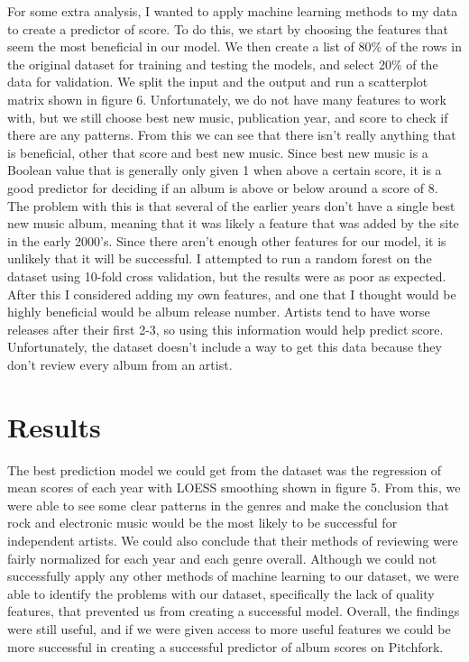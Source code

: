 \documentclass{article}
\begin{document}
For some extra analysis, I wanted to apply machine learning methods to
my data to create a predictor of score. To do this, we start by choosing
the features that seem the most beneficial in our model. We then create
a list of 80\% of the rows in the original dataset for training and
testing the models, and select 20\% of the data for validation. We split
the input and the output and run a scatterplot matrix shown in figure 6.
Unfortunately, we do not have many features to work with, but we still
choose best new music, publication year, and score to check if there are
any patterns. From this we can see that there isn't really anything that
is beneficial, other that score and best new music. Since best new music
is a Boolean value that is generally only given 1 when above a certain
score, it is a good predictor for deciding if an album is above or below
around a score of 8. The problem with this is that several of the
earlier years don't have a single best new music album, meaning that it
was likely a feature that was added by the site in the early 2000's.
Since there aren't enough other features for our model, it is unlikely
that it will be successful. I attempted to run a random forest on the
dataset using 10-fold cross validation, but the results were as poor as
expected. After this I considered adding my own features, and one that I
thought would be highly beneficial would be album release number.
Artists tend to have worse releases after their first 2-3, so using this
information would help predict score. Unfortunately, the dataset doesn't
include a way to get this data because they don't review every album
from an artist.

\section{Results}\label{results}

The best prediction model we could get from the dataset was the
regression of mean scores of each year with LOESS smoothing shown in
figure 5. From this, we were able to see some clear patterns in the
genres and make the conclusion that rock and electronic music would be
the most likely to be successful for independent artists. We could also
conclude that their methods of reviewing were fairly normalized for each
year and each genre overall. Although we could not successfully apply
any other methods of machine learning to our dataset, we were able to
identify the problems with our dataset, specifically the lack of quality
features, that prevented us from creating a successful model. Overall,
the findings were still useful, and if we were given access to more
useful features we could be more successful in creating a successful
predictor of album scores on Pitchfork.



\end{document}
